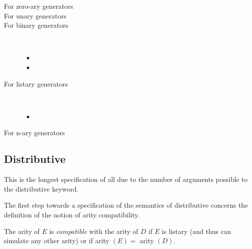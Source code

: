 \begin{description}

\item[For zero-ary generators] \na
\item[For unary generators] \na
\item[For binary generators]~
  \begin{itemize}
  \item

\item
{}
\end{itemize}

\item[For listary generators]~
  \begin{itemize}
  \item
  \end{itemize}

\item[For n-ary generators] \na

\end{description}


\subsection{Distributive}
\label{sec:distributive}

This is the longest specification of all due to the number of
arguments possible to the distributive keyword.

The first step towards a specification of the semantics of
distributive concerns the definition of the notion of arity
compatibility.

\begin{definition}
The arity of $E$ is {\em compatible} with the arity of $D$ if $E$ is
listary (and thus can simulate any other arity) or if arity $(E) =$
arity $(D)$.
\end{definition}

